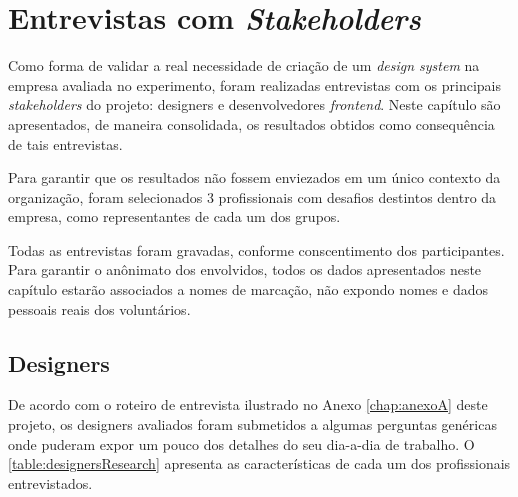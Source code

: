
\chapter{Entrevistas com \textit{Stakeholders}}
\label{chap:entrevistas}


Como forma de validar a real necessidade de criação de um \textit{design system} na empresa avaliada no experimento, foram realizadas entrevistas com os principais \textit{stakeholders} do projeto: designers e desenvolvedores \textit{frontend}. Neste capítulo são apresentados, de maneira consolidada, os resultados obtidos como consequência de tais entrevistas.

Para garantir que os resultados não fossem enviezados em um único contexto da organização, foram selecionados 3 profissionais com desafios destintos dentro da empresa, como representantes de cada um dos grupos.

Todas as entrevistas foram gravadas, conforme conscentimento dos participantes. Para garantir o anônimato dos envolvidos, todos os dados apresentados neste capítulo estarão associados a nomes de marcação, não expondo nomes e dados pessoais reais dos voluntários.

\section{Designers}
\label{sec:entrevistasDesigners}

De acordo com o roteiro de entrevista ilustrado no Anexo \ref{chap:anexoA} deste projeto, os designers avaliados foram submetidos a algumas perguntas genéricas onde puderam expor um pouco dos detalhes do seu dia-a-dia de trabalho. O \autoref{table:designersResearch} apresenta as características de cada um dos profissionais entrevistados.

